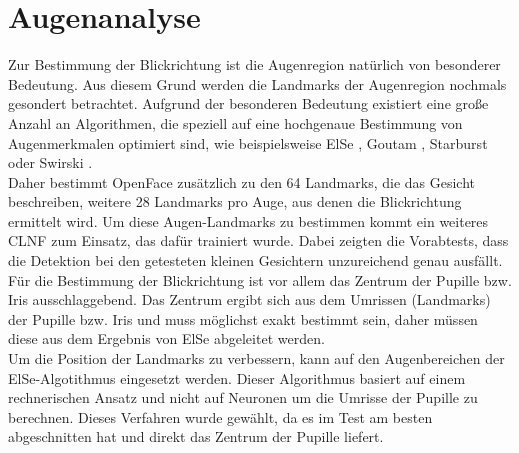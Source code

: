 \section{Augenanalyse}
\label{ElSe}
Zur Bestimmung der Blickrichtung ist die Augenregion natürlich von besonderer Bedeutung. Aus diesem Grund werden die Landmarks der Augenregion nochmals gesondert betrachtet. Aufgrund der besonderen Bedeutung existiert eine große Anzahl an Algorithmen, die speziell auf eine hochgenaue Bestimmung von Augenmerkmalen optimiert sind, wie beispielsweise ElSe \cite{ElSe}, Goutam \cite{Eye_FastCorner}, Starburst \cite{Starburst} oder Swirski \cite{Swirski2012}.\\
Daher bestimmt OpenFace zusätzlich zu den 64 Landmarks, die das Gesicht beschreiben, weitere 28 Landmarks pro Auge, aus denen die Blickrichtung ermittelt wird. Um diese Augen-Landmarks zu bestimmen kommt ein weiteres CLNF zum Einsatz, das dafür trainiert wurde. Dabei zeigten die Vorabtests, dass die Detektion bei den getesteten kleinen Gesichtern unzureichend genau ausfällt.\\
Für die Bestimmung der Blickrichtung ist vor allem das Zentrum der Pupille bzw. Iris ausschlaggebend. Das Zentrum ergibt sich aus dem Umrissen (Landmarks) der Pupille bzw. Iris und muss möglichst exakt bestimmt sein, daher müssen diese aus dem Ergebnis von ElSe abgeleitet werden.\\
Um die Position der Landmarks zu verbessern, kann auf den Augenbereichen der ElSe-Algotithmus eingesetzt werden. Dieser Algorithmus basiert auf einem rechnerischen Ansatz und nicht auf Neuronen um die Umrisse der Pupille zu berechnen. Dieses Verfahren wurde gewählt, da es im Test \cite{ElSe} am besten abgeschnitten hat und direkt das Zentrum der Pupille liefert.
